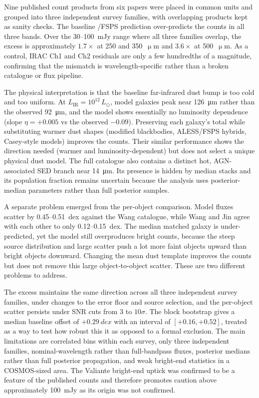 \documentclass[12pt,a4paper]{article}
\begin{document}
Nine published count products from six papers were placed in common units and grouped
into three independent survey families, with overlapping products kept as sanity checks. The baseline \popcosmos{}/FSPS prediction over-predicts the counts in all three
bands. Over the 30--\SI{100}{mJy} range where all three families overlap, the excess is
approximately $1.7\times$ at 250 and 350~$\upmu$m and $3.6\times$ at 500~$\upmu$m. As a
control, IRAC Ch1 and Ch2 residuals are only a few hundredths of a magnitude, confirming
that the mismatch is wavelength-specific rather than a broken catalogue or flux pipeline.

The physical interpretation is that the baseline far-infrared dust bump is too cold and too
uniform. At $L_\mathrm{IR} = 10^{12}\,L_\odot$, model galaxies peak near
\SI{126}{\um} rather than the observed \SI{92}{\um}, and the model shows essentially no
luminosity dependence (slope $\eta = +0.005$ vs the observed $-0.09$). Preserving each
galaxy's total \LIR{} while substituting warmer dust shapes (modified blackbodies,
ALESS/FSPS hybrids, Casey-style models) improves the counts. Their similar performance
shows the direction needed (warmer and luminosity-dependent) but does not
select a unique physical dust model. The full catalogue also contains a distinct hot,
AGN-associated SED branch near \SI{14}{\um}. Its presence is hidden by median stacks and
its population fraction remains uncertain because the analysis uses posterior-median
parameters rather than full posterior samples.

A separate problem emerged from the per-object comparison. Model fluxes scatter by
0.45--\SI{0.51}{dex} against the Wang catalogue, while Wang and Jin agree with each
other to only 0.12--\SI{0.15}{dex}. The median matched galaxy is under-predicted, yet
the model still overproduces bright counts, because the steep source distribution and
large scatter push a lot more faint objects upward than bright objects downward.
Changing the mean dust template improves the counts but does not remove this large
object-to-object scatter. These are two different problems to address.

The excess maintains the same direction across all three independent survey families, under
changes to the error floor and source selection, and the per-object scatter persists
under SNR cuts from 3 to $10\sigma$. The block bootstrap gives a median baseline offset
of $+\SI{0.29}{dex}$ with an interval of $[+0.16, +0.52]$, treated as a way to test how robust this it as opposed to
a formal exclusion. The main limitations are correlated bins within
each survey, only three independent families, nominal-wavelength rather than
full-bandpass fluxes, posterior medians rather than full posterior propagation, and weak
bright-end statistics in a COSMOS-sized area. The Valiante bright-end uptick was
confirmed to be a feature of the published counts and therefore promotes caution above approximately
\SI{100}{mJy} as its origin was not confirmed.
\end{document}
